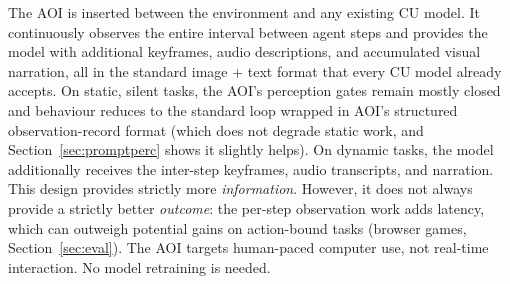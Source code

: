 \documentclass[11pt]{article}
\begin{document}
The AOI is inserted between the environment and any existing CU model. It continuously observes the entire interval between agent steps and provides the model with additional keyframes, audio descriptions, and accumulated visual narration, all in the standard image + text format that every CU model already accepts.
On static, silent tasks, the AOI's perception gates remain mostly closed and behaviour reduces to the standard loop wrapped in AOI's structured observation-record format (which does not degrade static work, and Section~\ref{sec:promptperc} shows it slightly helps). On dynamic tasks, the model additionally receives the inter-step keyframes, audio transcripts, and narration.
This design provides strictly more \emph{information}. However, it does not always provide a strictly better \emph{outcome}: the per-step observation work adds latency, which can outweigh potential gains on action-bound tasks (browser games, Section~\ref{sec:eval}). The AOI targets human-paced computer use, not real-time interaction.
No model retraining is needed.
\end{document}
